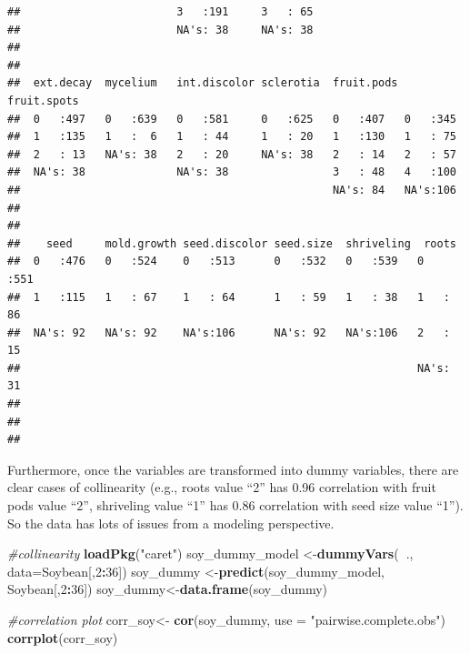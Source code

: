 \documentclass[]{book}
\newenvironment{Shaded}{\begin{snugshade}}{\end{snugshade}}
\newcommand{\CommentTok}[1]{\textcolor[rgb]{0.56,0.35,0.01}{\textit{#1}}}
\newcommand{\DataTypeTok}[1]{\textcolor[rgb]{0.13,0.29,0.53}{#1}}
\newcommand{\DecValTok}[1]{\textcolor[rgb]{0.00,0.00,0.81}{#1}}
\newcommand{\KeywordTok}[1]{\textcolor[rgb]{0.13,0.29,0.53}{\textbf{#1}}}
\newcommand{\NormalTok}[1]{#1}
\newcommand{\OperatorTok}[1]{\textcolor[rgb]{0.81,0.36,0.00}{\textbf{#1}}}
\newcommand{\StringTok}[1]{\textcolor[rgb]{0.31,0.60,0.02}{#1}}
\begin{document}
\begin{verbatim}
##                        3   :191     3   : 65                     
##                        NA's: 38     NA's: 38                     
##                                                                  
##                                                                  
##  ext.decay  mycelium   int.discolor sclerotia  fruit.pods fruit.spots
##  0   :497   0   :639   0   :581     0   :625   0   :407   0   :345   
##  1   :135   1   :  6   1   : 44     1   : 20   1   :130   1   : 75   
##  2   : 13   NA's: 38   2   : 20     NA's: 38   2   : 14   2   : 57   
##  NA's: 38              NA's: 38                3   : 48   4   :100   
##                                                NA's: 84   NA's:106   
##                                                                      
##                                                                      
##    seed     mold.growth seed.discolor seed.size  shriveling  roots    
##  0   :476   0   :524    0   :513      0   :532   0   :539   0   :551  
##  1   :115   1   : 67    1   : 64      1   : 59   1   : 38   1   : 86  
##  NA's: 92   NA's: 92    NA's:106      NA's: 92   NA's:106   2   : 15  
##                                                             NA's: 31  
##                                                                       
##                                                                       
## 
\end{verbatim}

Furthermore, once the variables are transformed into dummy variables, there are clear cases of collinearity (e.g., roots value ``2'' has 0.96 correlation with fruit pods value ``2'', shriveling value ``1'' has 0.86 correlation with seed size value ``1''). So the data has lots of issues from a modeling perspective.

\begin{Shaded}
\begin{Highlighting}[]
\CommentTok{#collinearity}
\KeywordTok{loadPkg}\NormalTok{(}\StringTok{"caret"}\NormalTok{)}
\NormalTok{soy_dummy_model <-}\KeywordTok{dummyVars}\NormalTok{(}\OperatorTok{~}\NormalTok{., }\DataTypeTok{data=}\NormalTok{Soybean[,}\DecValTok{2}\OperatorTok{:}\DecValTok{36}\NormalTok{])}
\NormalTok{soy_dummy <-}\KeywordTok{predict}\NormalTok{(soy_dummy_model, Soybean[,}\DecValTok{2}\OperatorTok{:}\DecValTok{36}\NormalTok{])}
\NormalTok{soy_dummy<-}\KeywordTok{data.frame}\NormalTok{(soy_dummy)}

\CommentTok{#correlation plot}
\NormalTok{corr_soy<-}\StringTok{ }\KeywordTok{cor}\NormalTok{(soy_dummy, }\DataTypeTok{use =} \StringTok{"pairwise.complete.obs"}\NormalTok{)}
\KeywordTok{corrplot}\NormalTok{(corr_soy)}
\end{Highlighting}
\end{Shaded}
\end{document}
